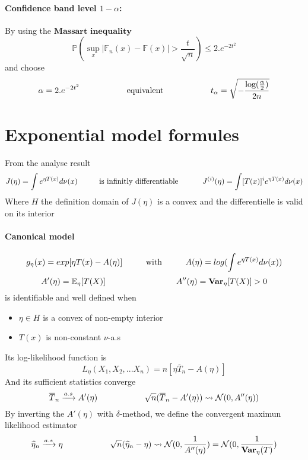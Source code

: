 \documentclass[a4paper,10pt]{article}
\begin{document}
\paragraph{Confidence band level $1-\alpha$: }
By using the $\textbf{Massart inequality}$
\[
\mathbb{P}( \sup_{x} | \mathbb{F}_n(x) -  \mathbb{F}(x) | > \frac{t}{\sqrt{n}} ) \leq 2.e^{-2t^2}
\]
and choose 
\[
\alpha =  2.e^{-2t^2} \hspace{20mm} \text{equivalent} \hspace{20mm} t_{\alpha} = \sqrt{ -\frac{\text{log}(\frac{\alpha}{2})}{2n} }
\]

\section{Exponential model formules}
From the analyse result
\[
J(\eta)=\int e^{\eta T(x)} d\nu(x) 
\hspace{10mm} \text{is infinitly differentiable } \hspace{10mm}
J^{(i)}(\eta)=\int [T(x)]^i e^{\eta T(x)} d\nu(x) 
\]
Where $H$ the definition domain of $J(\eta)$ is a convex and the differentielle is valid on its interior
\paragraph{Canonical model}
\[
g_{\eta}(x) = exp [\eta T(x) - A(\eta)]
\hspace{10mm} \text{with} \hspace{10mm}
 A(\eta) = log (\int e^{ \eta T(x)}  d\nu(x) ) 
\]
\[
 A'(\eta) = \mathbb{E}_{\eta}[T(X)]  
\hspace{30mm} 
 A''(\eta)= \textbf{Var}_{\eta}[T(X)]  > 0
\]
is identifiable and well defined when 
\begin{itemize}
 \item ${\eta \in H}$ is a convex of non-empty interior
 \item $T(x)$ is non-constant $\nu$-a.s
\end{itemize}
Its log-likelihood function is 
\[
L_{\eta}(X_1,X_2,...X_n) = n[\eta \overline{T}_n -A(\eta)]
\]
And its sufficient statistics converge
\[
\overline{T}_n \xrightarrow{a.s} A'(\eta) 
\hspace{20mm}
\sqrt{n}(\overline{T}_n - A'(\eta) ) \rightsquigarrow   \mathcal{N}(0,A''(\eta))
\]
By inverting the $A'(\eta)$ with $\delta$-method, we define the convergent maximun likelihood estimator 
\[
\widehat{\eta}_n \xrightarrow{a.s} \eta 
\hspace{20mm}
\sqrt{n}(\widehat{\eta}_n - \eta ) \rightsquigarrow   \mathcal{N}(0,\frac{1}{A''(\eta)} ) = \mathcal{N}(0,\frac{1}{\textbf{Var}_{\eta}(T)} )
\]
\end{document}
